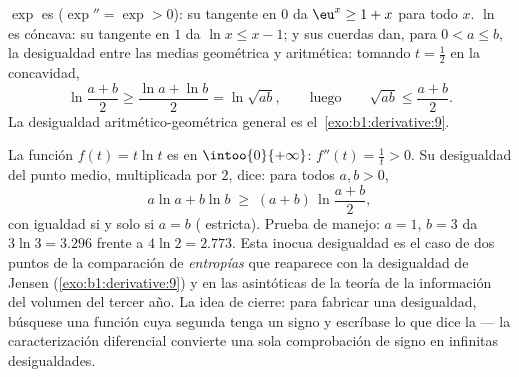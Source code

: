 \begin{example}\label{ex:b1:derivative:convexineq}
$\exp$ es  ($\exp'' = \exp > 0$): su tangente en $0$ da
$\eu^x \geq 1 + x$ para todo $x$. $\ln$ es cóncava: su tangente en $1$
da $\ln x \leq x - 1$; y sus cuerdas dan, para $0 < a \leq b$, la
desigualdad entre las medias geométrica y aritmética: tomando
$t = \frac12$ en la concavidad,
\[
\ln\frac{a + b}{2} \geq \frac{\ln a + \ln b}{2} = \ln\sqrt{ab},
\qquad\text{luego}\qquad
\sqrt{ab} \leq \frac{a+b}{2} .
\]
La desigualdad aritmético-geométrica general es
el~\cref{exo:b1:derivative:9}.
\end{example}

\begin{example}\label{ex:b1:derivative:xlnx}
La función $f(t) = t\ln t$ es  en $\intoo{0}{+\infty}$:
$f''(t) = \frac1t > 0$. Su desigualdad del punto medio, multiplicada
por $2$, dice: para todos $a, b > 0$,
\[
a\ln a + b\ln b \;\geq\; (a + b)\,\ln\frac{a + b}{2} ,
\]
con igualdad si y solo si $a = b$ ( estricta). Prueba de
manejo: $a = 1$, $b = 3$ da $3\ln 3 = 3.296$ frente a
$4\ln 2 = 2.773$. Esta inocua desigualdad es el caso de dos puntos de
la comparación de \emph{entropías} que reaparece con la desigualdad de
Jensen (\cref{exo:b1:derivative:9}) y en las asintóticas de la teoría
de la información del volumen del tercer año. La idea de cierre: para
fabricar una desigualdad, búsquese una función cuya segunda
 tenga un signo y escríbase lo que dice la  --- la
caracterización diferencial convierte una sola comprobación de signo
en infinitas desigualdades.
\end{example}

